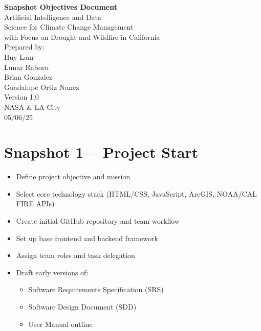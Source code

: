 \documentclass[12pt]{article}
\begin{document}
\begin{flushright}
\Huge \textbf{Snapshot Objectives Document} \\[2em]
\color{blue}
\LARGE Artificial Intelligence and Data\\
Science for Climate Change Management\\
with Focus on Drought and Wildfire in California\\[2em]
\color{black}
\large Prepared by:\\
Huy Lam\\
Lunar Raborn\\
Brian Gonzalez\\
Guadalupe Ortiz Nunez\\[1em]
Version 1.0\\
NASA \& LA City\\
05/06/25
\end{flushright}
\newpage

\tableofcontents
\newpage

\section{Snapshot 1 – Project Start}
\begin{itemize}[leftmargin=*]
    \item Define project objective and mission
    \item Select core technology stack (HTML/CSS, JavaScript, ArcGIS, NOAA/CAL FIRE APIs)
    \item Create initial GitHub repository and team workflow
    \item Set up base frontend and backend framework
    \item Assign team roles and task delegation
    \item Draft early versions of:
    \begin{itemize}
        \item Software Requirements Specification (SRS)
        \item Software Design Document (SDD)
        \item User Manual outline
    \end{itemize}
\end{itemize}
\end{document}
